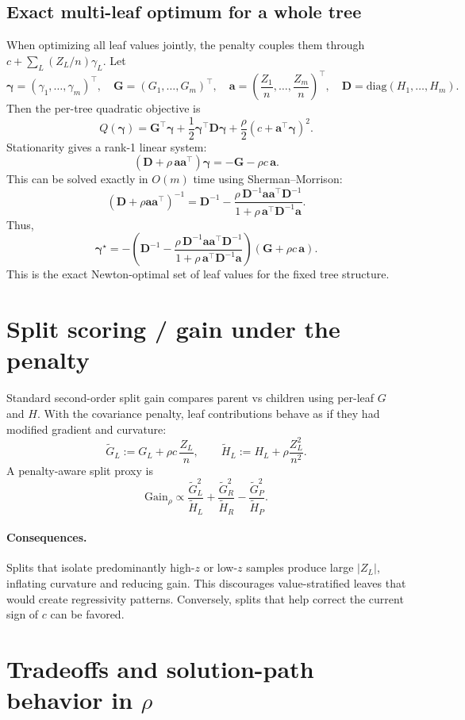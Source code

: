 \documentclass[11pt]{article}
\theoremstyle{plain}
\theoremstyle{definition}
\newcommand{\1}{\mathbf{1}}
\begin{document}
{\subsection{Exact multi-leaf optimum for a whole tree}
When optimizing all leaf values jointly, the penalty couples them through \(c + \sum_L (Z_L/n)\gamma_L\). Let
\[
\bm\gamma=(\gamma_1,\dots,\gamma_m)^\top,\quad
\bm G=(G_1,\dots,G_m)^\top,\quad
\bm a=\left(\frac{Z_1}{n},\dots,\frac{Z_m}{n}\right)^\top,\quad
\bm D=\mathrm{diag}(H_1,\dots,H_m).
\]
Then the per-tree quadratic objective is
\[
Q(\bm\gamma)=\bm G^\top\bm\gamma + \frac{1}{2}\bm\gamma^\top\bm D\bm\gamma
+ \frac{\rho}{2}\left(c + \bm a^\top\bm\gamma\right)^2.
\]
Stationarity gives a rank-1 linear system:
\[
(\bm D + \rho\,\bm a\bm a^\top)\bm\gamma = -\bm G - \rho c\,\bm a.
\]
This can be solved exactly in \(O(m)\) time using Sherman--Morrison:
\[
(\bm D+\rho\bm a\bm a^\top)^{-1} =
\bm D^{-1} - \frac{\rho\,\bm D^{-1}\bm a\bm a^\top \bm D^{-1}}{1+\rho\,\bm a^\top \bm D^{-1}\bm a}.
\]
Thus,
\[
\boxed{
\bm\gamma^\star
=
-\left(\bm D^{-1} - \frac{\rho\,\bm D^{-1}\bm a\bm a^\top \bm D^{-1}}{1+\rho\,\bm a^\top \bm D^{-1}\bm a}\right)
(\bm G+\rho c\,\bm a)
}.
\]
This is the exact Newton-optimal set of leaf values for the fixed tree structure.

\section{Split scoring / gain under the penalty}

Standard second-order split gain compares parent vs children using per-leaf \(G\) and \(H\). With the covariance penalty, leaf contributions behave as if they had modified gradient and curvature:
\[
\tilde G_L := G_L + \rho c\,\frac{Z_L}{n},
\qquad
\tilde H_L := H_L + \rho\frac{Z_L^2}{n^2}.
\]
A penalty-aware split proxy is
\[
\mathrm{Gain}_\rho \propto
\frac{\tilde G_L^2}{\tilde H_L} + \frac{\tilde G_R^2}{\tilde H_R} - \frac{\tilde G_P^2}{\tilde H_P}.
\]
\paragraph{Consequences.}
Splits that isolate predominantly high-\(z\) or low-\(z\) samples produce large \(|Z_L|\), inflating curvature and reducing gain. This discourages value-stratified leaves that would create regressivity patterns. Conversely, splits that help correct the current sign of \(c\) can be favored.

\section{Tradeoffs and solution-path behavior in \texorpdfstring{\(\rho\)}{rho}}

}
\end{document}
